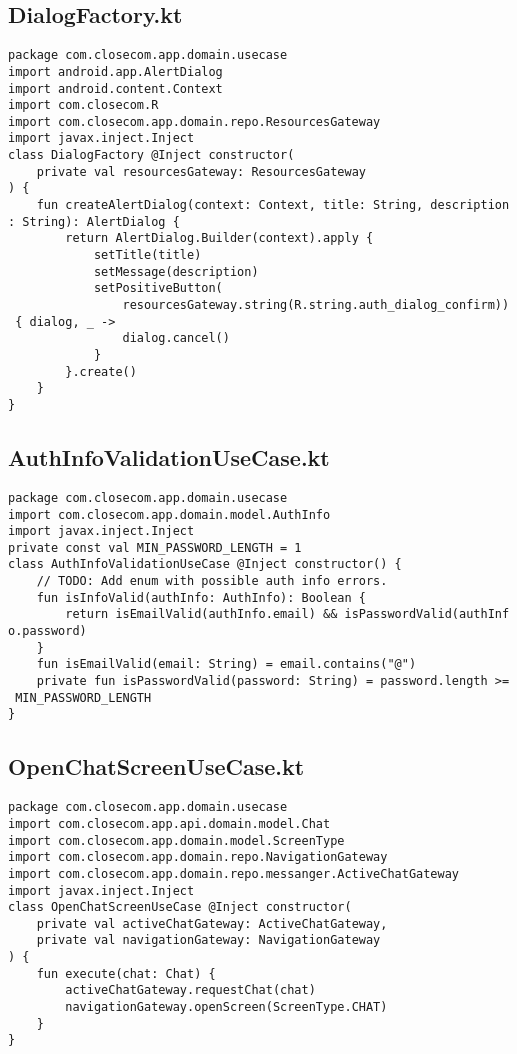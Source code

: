 \documentclass[listing]{espd}
\begin{document}
\subsection{DialogFactory.kt}
\begin{verbatim}
package com.closecom.app.domain.usecase
import android.app.AlertDialog
import android.content.Context
import com.closecom.R
import com.closecom.app.domain.repo.ResourcesGateway
import javax.inject.Inject
class DialogFactory @Inject constructor(
    private val resourcesGateway: ResourcesGateway
) {
    fun createAlertDialog(context: Context, title: String, description
: String): AlertDialog {
        return AlertDialog.Builder(context).apply {
            setTitle(title)
            setMessage(description)
            setPositiveButton(
                resourcesGateway.string(R.string.auth_dialog_confirm))
 { dialog, _ ->
                dialog.cancel()
            }
        }.create()
    }
}
\end{verbatim}

\subsection{AuthInfoValidationUseCase.kt}
\begin{verbatim}
package com.closecom.app.domain.usecase
import com.closecom.app.domain.model.AuthInfo
import javax.inject.Inject
private const val MIN_PASSWORD_LENGTH = 1
class AuthInfoValidationUseCase @Inject constructor() {
    // TODO: Add enum with possible auth info errors.
    fun isInfoValid(authInfo: AuthInfo): Boolean {
        return isEmailValid(authInfo.email) && isPasswordValid(authInf
o.password)
    }
    fun isEmailValid(email: String) = email.contains("@")
    private fun isPasswordValid(password: String) = password.length >=
 MIN_PASSWORD_LENGTH
}
\end{verbatim}

\subsection{OpenChatScreenUseCase.kt}
\begin{verbatim}
package com.closecom.app.domain.usecase
import com.closecom.app.api.domain.model.Chat
import com.closecom.app.domain.model.ScreenType
import com.closecom.app.domain.repo.NavigationGateway
import com.closecom.app.domain.repo.messanger.ActiveChatGateway
import javax.inject.Inject
class OpenChatScreenUseCase @Inject constructor(
    private val activeChatGateway: ActiveChatGateway,
    private val navigationGateway: NavigationGateway
) {
    fun execute(chat: Chat) {
        activeChatGateway.requestChat(chat)
        navigationGateway.openScreen(ScreenType.CHAT)
    }
}
\end{verbatim}
\end{document}
